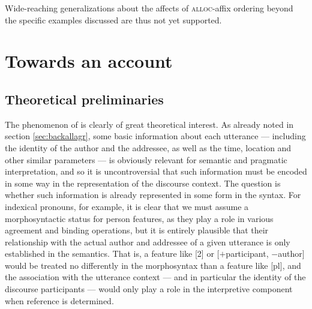 \documentclass[output=paper, modfonts, nonflat]{langsci/langscibook}
\begin{document}
\ea\label{coffee}
  \z
\z
%
Wide-reaching generalizations about the affects of \textsc{alloc}-affix
ordering beyond the specific examples discussed are thus not yet
supported.

\section{Towards an account}
\label{sec:towards-an-account}

\subsection{Theoretical preliminaries}
\label{sec:theoprelim}

The phenomenon of \allagr{} is clearly of great theoretical
interest. As already noted in section \ref{sec:backallagr}, some basic
information about each utterance --- including the identity of the
author and the addressee, as well as the time, location and other
similar parameters --- is obviously relevant for semantic and
pragmatic interpretation, and so it is uncontroversial that such
information must be encoded in some way in the representation of the
discourse context. The question is whether such information is already
represented in some form in the syntax. For indexical pronouns, for
example, it is clear that we must assume a morphosyntactic status for
person features, as they play a role in various agreement and binding
operations, but it is entirely plausible that their relationship with
the actual author and addressee of a given utterance is only
established in the semantics. That is, a feature like [2] or
[$+$participant, $-$author] would be treated no differently in the
morphosyntax than a feature like [pl], and the association with the
utterance context --- and in particular the identity of the discourse
participants --- would only play a role in the interpretive component
when reference is determined.
\end{document}
